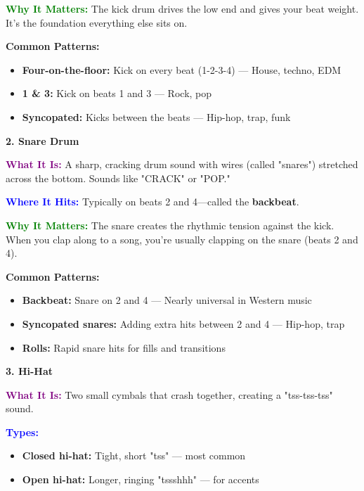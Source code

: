 \documentclass[11pt,letterpaper]{article}
\newcommand{\purple}[1]{\textcolor{purple}{\textbf{#1}}}
\newcommand{\bluepurple}[1]{\textcolor{blue}{\textbf{#1}}}
\newcommand{\greentext}[1]{\textcolor{green}{\textbf{#1}}}
\begin{document}
\textbf{\greentext{Why It Matters:}} The kick drum drives the low end and gives your beat weight. It's the foundation everything else sits on.

\textbf{Common Patterns:}
\begin{itemize}[leftmargin=*]
\item \textbf{Four-on-the-floor:} Kick on every beat (1-2-3-4) — House, techno, EDM
\item \textbf{1 \& 3:} Kick on beats 1 and 3 — Rock, pop
\item \textbf{Syncopated:} Kicks between the beats — Hip-hop, trap, funk
\end{itemize}

\vspace{0.5cm}

\textbf{2. Snare Drum}

\textbf{\purple{What It Is:}} A sharp, cracking drum sound with wires (called "snares") stretched across the bottom. Sounds like "CRACK" or "POP."

\textbf{\bluepurple{Where It Hits:}} Typically on beats 2 and 4—called the \textbf{backbeat}.

\textbf{\greentext{Why It Matters:}} The snare creates the rhythmic tension against the kick. When you clap along to a song, you're usually clapping on the snare (beats 2 and 4).

\textbf{Common Patterns:}
\begin{itemize}[leftmargin=*]
\item \textbf{Backbeat:} Snare on 2 and 4 — Nearly universal in Western music
\item \textbf{Syncopated snares:} Adding extra hits between 2 and 4 — Hip-hop, trap
\item \textbf{Rolls:} Rapid snare hits for fills and transitions
\end{itemize}

\vspace{0.5cm}

\textbf{3. Hi-Hat}

\textbf{\purple{What It Is:}} Two small cymbals that crash together, creating a "tss-tss-tss" sound.

\textbf{\bluepurple{Types:}}
\begin{itemize}[leftmargin=*]
\item \textbf{Closed hi-hat:} Tight, short "tss" — most common
\item \textbf{Open hi-hat:} Longer, ringing "tssshhh" — for accents
\end{itemize}
\end{document}
